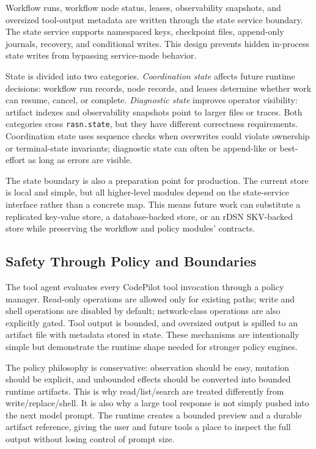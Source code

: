\documentclass[manuscript,screen,review]{acmart}
\newcommand{\rdsn}{rDSN\xspace}
\begin{document}
Workflow runs, workflow node status, leases, observability snapshots, and
oversized tool-output metadata are written through the state service boundary.
The state service supports namespaced keys, checkpoint files, append-only
journals, recovery, and conditional writes. This design prevents hidden
in-process state writes from bypassing service-mode behavior.

State is divided into two categories. \emph{Coordination state} affects future
runtime decisions: workflow run records, node records, and leases determine
whether work can resume, cancel, or complete. \emph{Diagnostic state} improves
operator visibility: artifact indexes and observability snapshots point to
larger files or traces. Both categories cross \texttt{rasn.state}, but they have
different correctness requirements. Coordination state uses sequence checks when
overwrites could violate ownership or terminal-state invariants; diagnostic
state can often be append-like or best-effort as long as errors are visible.

The state boundary is also a preparation point for production. The current store
is local and simple, but all higher-level modules depend on the state-service
interface rather than a concrete map. This means future work can substitute a
replicated key-value store, a database-backed store, or an \rdsn SKV-backed
store while preserving the workflow and policy modules' contracts.

\subsection{Safety Through Policy and Boundaries}

The tool agent evaluates every CodePilot tool invocation through a policy
manager. Read-only operations are allowed only for existing paths; write and
shell operations are disabled by default; network-class operations are also
explicitly gated. Tool output is bounded, and oversized output is spilled to an
artifact file with metadata stored in state. These mechanisms are intentionally
simple but demonstrate the runtime shape needed for stronger policy engines.

The policy philosophy is conservative: observation should be easy, mutation
should be explicit, and unbounded effects should be converted into bounded
runtime artifacts. This is why read/list/search are treated differently from
write/replace/shell. It is also why a large tool response is not simply pushed
into the next model prompt. The runtime creates a bounded preview and a durable
artifact reference, giving the user and future tools a place to inspect the full
output without losing control of prompt size.
\end{document}
